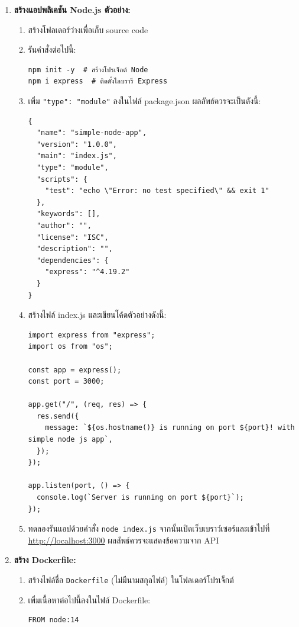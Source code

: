 \begin{enumerate}
      \item \textbf{สร้างแอปพลิเคชัน Node.js ตัวอย่าง:}
            \begin{enumerate}
                  \item สร้างโฟลเดอร์ว่างเพื่อเก็บ source code
                  \item รันคำสั่งต่อไปนี้:
                        \begin{verbatim}
npm init -y  # สร้างโปรเจ็กต์ Node
npm i express  # ติดตั้งไลบรารี Express
        \end{verbatim}
                  \item เพิ่ม \texttt{"type": "module"} ลงในไฟล์ package.json ผลลัพธ์ควรจะเป็นดังนี้:
                        \begin{verbatim}
{
  "name": "simple-node-app",
  "version": "1.0.0",
  "main": "index.js",
  "type": "module",
  "scripts": {
    "test": "echo \"Error: no test specified\" && exit 1"
  },
  "keywords": [],
  "author": "",
  "license": "ISC",
  "description": "",
  "dependencies": {
    "express": "^4.19.2"
  }
}
        \end{verbatim}
                        \clearpage
                  \item สร้างไฟล์ index.js และเขียนโค้ดตัวอย่างดังนี้:
                        \begin{verbatim}
import express from "express";
import os from "os";

const app = express();
const port = 3000;

app.get("/", (req, res) => {
  res.send({
    message: `${os.hostname()} is running on port ${port}! with simple node js app`,
  });
});

app.listen(port, () => {
  console.log(`Server is running on port ${port}`);
});
        \end{verbatim}
                  \item ทดลองรันแอปด้วยคำสั่ง \texttt{node index.js} จากนั้นเปิดเว็บเบราว์เซอร์และเข้าไปที่ \url{http://localhost:3000} ผลลัพธ์ควรจะแสดงข้อความจาก API
            \end{enumerate}

      \item \textbf{สร้าง Dockerfile:}
            \begin{enumerate}
                  \item สร้างไฟล์ชื่อ \texttt{Dockerfile} (ไม่มีนามสกุลไฟล์) ในโฟลเดอร์โปรเจ็กต์
                  \item เพิ่มเนื้อหาต่อไปนี้ลงในไฟล์ Dockerfile:
                        \begin{verbatim}
FROM node:14


\end{verbatim}
\end{enumerate}
\end{enumerate}
